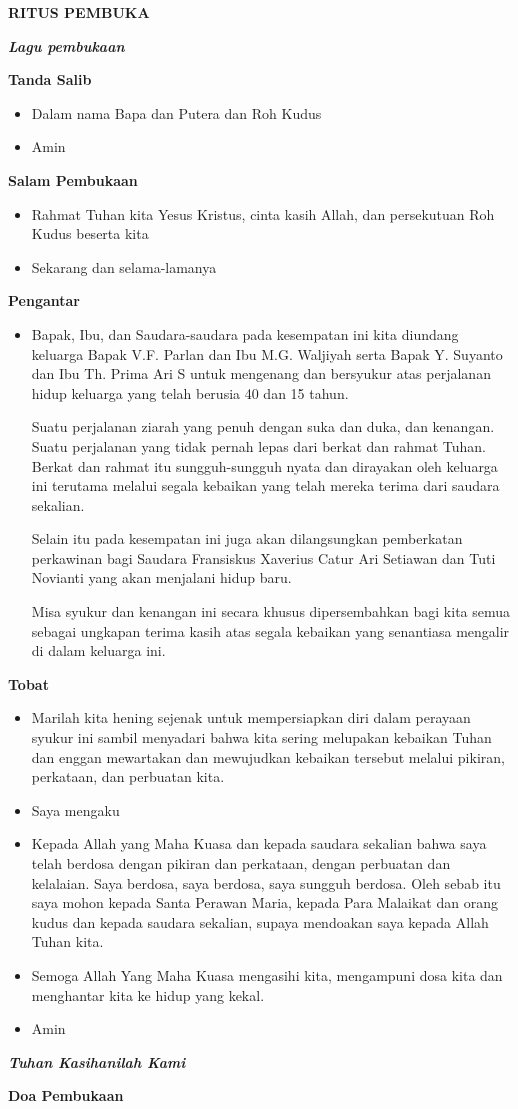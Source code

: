 \documentclass[10pt]{book}
\makeatletter
\newcommand{\judul}[1]{%
  {\parindent \z@ \centering \normalfont
    \interlinepenalty\@M \Large \bfseries #1\par\nobreak \vskip 20\p@ }}
\newcommand{\subjudul}[1]{%
  {\parindent \z@ \normalfont
    \interlinepenalty\@M \bfseries #1\par\nobreak \vskip 20\p@ }}
\newcommand{\lagu}[1]{%
  {\parindent \z@ \normalfont
    \interlinepenalty\@M \bfseries \emph{#1}\par\nobreak \vskip 20\p@ }}
\newcommand{\BU}[1]{\begin{itemize} \item[U:] #1 \end{itemize}}
\newcommand{\BI}[1]{\begin{itemize} \item[I:] #1 \end{itemize}}
\newcommand{\ultah}{40 }
\newcommand{\suami}{V.F. Parlan }
\newcommand{\istri}{M.G. Waljiyah }
\newcommand{\ultahdua}{15 }
\newcommand{\suamidua}{Y. Suyanto }
\newcommand{\istridua}{Th. Prima Ari S }
\newcommand{\mempelaip}{Fransiskus Xaverius Catur Ari Setiawan }
\newcommand{\mempelaiw}{Tuti Novianti }
\makeatother
\begin{document}
\thispagestyle{empty}
\Large
\judul{RITUS PEMBUKA}

\lagu{Lagu pembukaan}

\subjudul{Tanda Salib}
\BI{Dalam nama Bapa dan Putera dan Roh Kudus}
\BU{Amin}

\subjudul{Salam Pembukaan}
\BI{Rahmat Tuhan kita Yesus Kristus, cinta kasih Allah, dan persekutuan Roh Kudus beserta kita}
\BU{Sekarang dan selama-lamanya}

\subjudul{Pengantar}
\BI{Bapak, Ibu, dan Saudara-saudara pada kesempatan ini kita diundang keluarga Bapak \suami dan Ibu \istri serta Bapak \suamidua dan Ibu \istridua untuk mengenang dan bersyukur atas perjalanan hidup keluarga yang telah berusia \ultah dan \ultahdua tahun.

Suatu perjalanan ziarah yang penuh dengan suka dan duka, dan kenangan. Suatu perjalanan yang tidak pernah lepas dari berkat dan rahmat Tuhan. Berkat dan rahmat itu sungguh-sungguh nyata dan dirayakan oleh keluarga ini terutama melalui segala kebaikan yang telah mereka terima dari saudara sekalian.

Selain itu pada kesempatan ini juga akan dilangsungkan pemberkatan perkawinan bagi Saudara \mempelaip dan \mempelaiw yang akan menjalani hidup baru.

Misa syukur dan kenangan ini secara khusus dipersembahkan bagi kita semua sebagai ungkapan terima kasih atas segala kebaikan yang senantiasa mengalir di dalam keluarga ini.}

\subjudul{Tobat}
\BI{Marilah kita hening sejenak untuk mempersiapkan diri dalam perayaan syukur ini sambil menyadari bahwa kita sering melupakan kebaikan Tuhan dan enggan mewartakan dan mewujudkan kebaikan tersebut melalui pikiran, perkataan, dan perbuatan kita.}

\BI{Saya mengaku}

\BU{Kepada Allah yang Maha Kuasa dan kepada saudara sekalian bahwa saya telah berdosa dengan pikiran dan perkataan, dengan perbuatan dan kelalaian. Saya berdosa, saya berdosa, saya sungguh berdosa. Oleh sebab itu saya mohon kepada Santa Perawan Maria, kepada Para Malaikat dan orang kudus dan kepada saudara sekalian, supaya mendoakan saya kepada Allah Tuhan kita.}

\BI{Semoga Allah Yang Maha Kuasa mengasihi kita, mengampuni dosa kita dan menghantar kita ke hidup yang kekal.}

\BU{Amin}

\lagu{Tuhan Kasihanilah Kami}

\subjudul{Doa Pembukaan}
\end{document}
